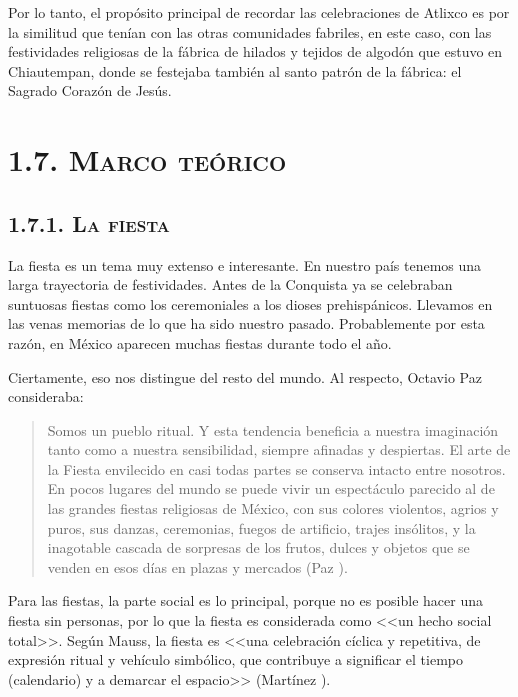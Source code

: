 \documentclass[14pt,letterpaper,twoside]{extbook} %
\begin{document}
\noindent Por lo tanto, el propósito principal de recordar las celebraciones de Atlixco es por la similitud que tenían con las otras comunidades fabriles, en este caso, con las festividades religiosas de la fábrica de hilados y tejidos de algodón que estuvo en Chiautempan, donde se festejaba también al santo patrón de la fábrica: el Sagrado Corazón de Jesús.

\section*{\mdseries\large\textsc{1.7. Marco teórico}}
\subsection*{\mdseries\large\textsc{1.7.1. La fiesta}}

\noindent La fiesta es un tema muy extenso e interesante. En nuestro país tenemos una larga trayectoria de festividades. Antes de la Conquista ya se celebraban suntuosas fiestas como los ceremoniales a los dioses prehispánicos. Llevamos en las venas memorias de lo que ha sido nuestro pasado. Probablemente por esta razón, en México aparecen muchas fiestas durante todo el año.

Ciertamente, eso nos distingue del resto del mundo. Al respecto, Octavio Paz consideraba:

\begin{quotation}
\noindent Somos un pueblo ritual. Y esta tendencia beneficia a nuestra imaginación tanto como a nuestra sensibilidad, siempre afinadas y despiertas. El arte de la Fiesta envilecido en casi todas partes se conserva intacto entre nosotros. En pocos lugares del mundo se puede vivir un espectáculo parecido al de las grandes fiestas religiosas de México, con sus colores violentos, agrios y puros, sus danzas, ceremonias, fuegos de artificio, trajes insólitos, y la inagotable cascada de sorpresas de los frutos, dulces y objetos que se venden en esos días en plazas y mercados (Paz ).
\end{quotation}

\noindent Para las fiestas, la parte social es lo principal, porque no es posible hacer una fiesta sin personas, por lo que la fiesta es considerada como <<un hecho social total>>. Según Mauss, la fiesta es <<una celebración cíclica y repetitiva, de expresión ritual y vehículo simbólico, que contribuye a significar el tiempo (calendario) y a demarcar el espacio>> (Martínez ).
\end{document}
